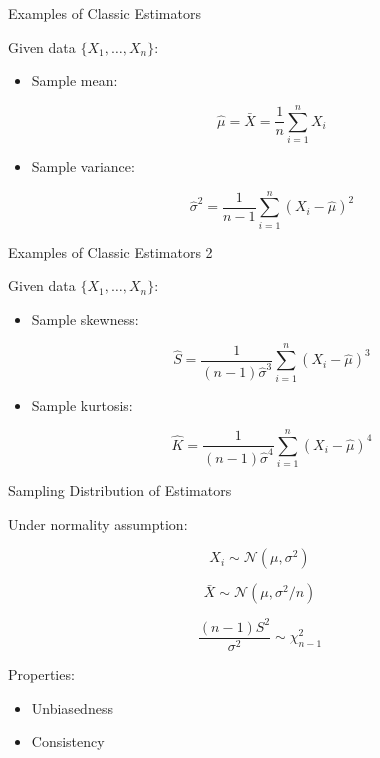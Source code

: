 \documentclass[aspectratio=169]{beamer}
\begin{document}
\begin{frame}{Examples of Classic Estimators}

Given data $\{X_1,\dots,X_n\}$:

\begin{itemize}

\item Sample mean:

\[
\hat{\mu} = \bar{X} = \frac{1}{n}\sum_{i=1}^{n}X_i
\]

\item Sample variance:

\[
\hat{\sigma}^2 =
\frac{1}{n-1}\sum_{i=1}^{n}(X_i-\hat{\mu})^2
\]

\end{itemize}

\end{frame}
\begin{frame}{Examples of Classic Estimators 2}

Given data $\{X_1,\dots,X_n\}$:

\begin{itemize}

\item Sample skewness:

\[
\hat{S} =
\frac{1}{(n-1)\hat{\sigma}^3}
\sum_{i=1}^{n}(X_i-\hat{\mu})^3
\]

\item Sample kurtosis:

\[
\hat{K} =
\frac{1}{(n-1)\hat{\sigma}^4}
\sum_{i=1}^{n}(X_i-\hat{\mu})^4
\]

\end{itemize}

\end{frame}

\begin{frame}{Sampling Distribution of Estimators}

Under normality assumption:

\[
X_i \sim \mathcal{N}(\mu,\sigma^2)
\]

\[
\bar{X} \sim \mathcal{N}(\mu,\sigma^2/n)
\]

\[
\frac{(n-1)S^2}{\sigma^2} \sim \chi^2_{n-1}
\]

Properties:

\begin{itemize}
\item Unbiasedness
\item Consistency
\end{itemize}

\end{frame}
\end{document}
